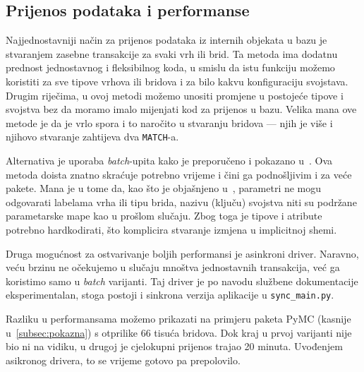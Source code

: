 \subsection{Prijenos podataka i performanse} \label{subsec:performanse}
Najjednostavniji način za prijenos podataka iz internih
objekata u bazu je stvaranjem zasebne transakcije za svaki vrh
ili brid. Ta metoda ima dodatnu prednost jednostavnog i 
fleksibilnog koda, u smislu da istu funkciju možemo koristiti
za sve tipove vrhova ili bridova i za bilo kakvu konfiguraciju svojstava.
Drugim riječima, u ovoj metodi možemo unositi promjene
u postojeće tipove i svojstva bez da moramo imalo mijenjati kod
za prijenos u bazu. Velika mana ove metode je da je vrlo spora i to
naročito u stvaranju bridova --- njih je više i njihovo stvaranje
zahtijeva dva \texttt{MATCH}-a.

Alternativa je uporaba \emph{batch}-upita kako je preporučeno
i pokazano u~\cite{neo4j:performance}. Ova metoda doista znatno
skraćuje potrebno vrijeme i čini ga podnošljivim i za veće pakete.
Mana je u tome da, kao što je objašnjeno u~\cite{neo4j:params},
parametri ne mogu odgovarati labelama vrha ili tipu brida, nazivu
(ključu) svojstva niti su podržane parametarske mape kao u
prošlom slučaju. Zbog toga je tipove i atribute potrebno
hardkodirati, što komplicira stvaranje izmjena
u implicitnoj shemi.

Druga mogućnost za ostvarivanje boljih performansi je asinkroni driver.
Naravno, veću brzinu ne očekujemo u slučaju mnoštva jednostavnih
transakcija, već ga koristimo samo u \emph{batch} varijanti. Taj driver
je po navodu službene dokumentacije eksperimentalan, stoga postoji
i sinkrona verzija aplikacije u \texttt{sync_\-main.py}.

Razliku u performansama možemo prikazati na primjeru paketa
PyMC (kasnije u~\ref{subsec:pokazna}) s otprilike 66 tisuća bridova.
Dok kraj u prvoj varijanti nije bio ni na vidiku,
u drugoj je cjelokupni prijenos trajao 20 minuta.
Uvođenjem asikronog drivera, to se vrijeme gotovo pa prepolovilo.

